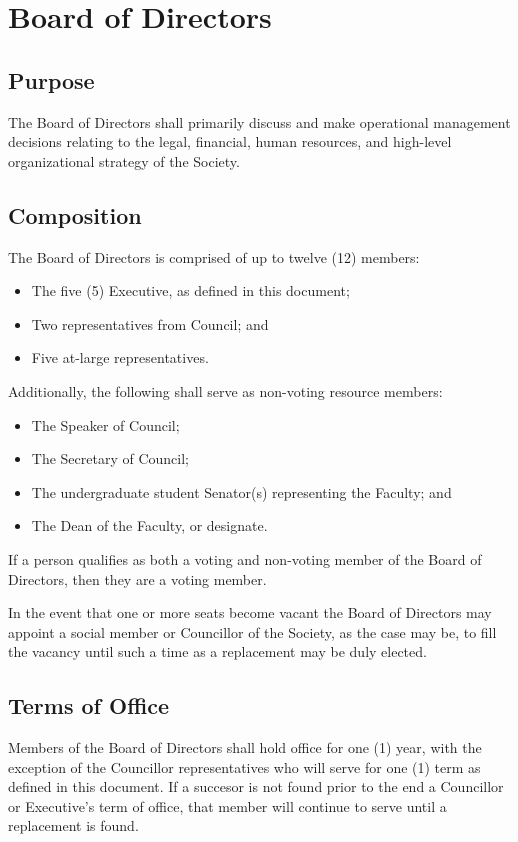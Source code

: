 \section{Board of Directors}
\subsection{Purpose}
The Board of Directors shall primarily 
discuss and make operational management decisions relating to the legal, 
financial, human resources, and high-level organizational strategy of the Society.

\subsection{Composition}
The Board of Directors is comprised of up to twelve (12) members:
\begin{itemize}
    \item The five (5) Executive, as defined in this document; 
  \item Two representatives from Council; and
  \item Five at-large representatives.
\end{itemize}

\noindent Additionally, the following shall serve as non-voting resource members:
\begin{itemize}
  \item The Speaker of Council;
  \item The Secretary of Council;
  \item The undergraduate student Senator(s) representing the Faculty; and
  \item The Dean of the Faculty, or designate.
\end{itemize}

If a person qualifies as both a voting and non-voting member of the Board of 
Directors, then they are a voting member.

In the event that one or more seats become vacant the
Board of Directors may appoint a social member or Councillor of the Society,
as the case may be, to fill the vacancy until such a time as a replacement may be duly elected.

\subsection{Terms of Office}
Members of the Board of Directors shall hold office for one (1) year, with the
exception of the Councillor representatives who will serve for one (1) term as
defined in this document. If a succesor is not found prior to the end a 
Councillor or Executive's term of office, that member will continue to serve 
until a replacement is found. 

